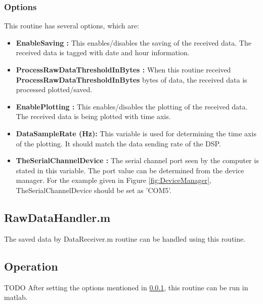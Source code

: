 \documentclass{article}
\begin{document}
\subsubsection{Options}
\label{subsubsection:Options}
This routine has several options, which are:
\begin{itemize}
	\item \textbf{EnableSaving :} This enables/disables the saving of the received data. The received data is tagged with date and hour information.
	\item \textbf{ProcessRawDataThresholdInBytes :} When this routine received \textbf{ProcessRawDataThresholdInBytes} bytes of data, the received data is processed plotted/saved.
	\item \textbf{EnablePlotting :} This enables/disables the plotting of the received data. The received data is being plotted with time axis. 
	\item \textbf{DataSampleRate (Hz):} This variable is used for determining the time axis of the plotting. It should match the data sending rate of the DSP.
	\item \textbf{TheSerialChannelDevice :} The serial channel port seen by the computer is stated in this variable. The port value can be determined from the device manager. For the example given in Figure \ref{fig:DeviceManager}, TheSerialChannelDevice should be set as 'COM5'.
\end{itemize}

\subsection{RawDataHandler.m}
The saved data by DataReceiver.m routine can be handled using this routine.
\subsection{Operation} TODO
After setting the options mentioned in \ref{subsubsection:Options}, this routine can be run in matlab.
\end{document}
